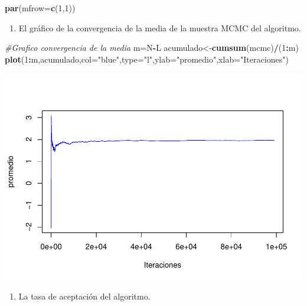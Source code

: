 \documentclass[
]{article}
\newenvironment{Shaded}{\begin{snugshade}}{\end{snugshade}}
\newcommand{\AttributeTok}[1]{\textcolor[rgb]{0.13,0.29,0.53}{#1}}
\newcommand{\CommentTok}[1]{\textcolor[rgb]{0.56,0.35,0.01}{\textit{#1}}}
\newcommand{\DecValTok}[1]{\textcolor[rgb]{0.00,0.00,0.81}{#1}}
\newcommand{\FunctionTok}[1]{\textcolor[rgb]{0.13,0.29,0.53}{\textbf{#1}}}
\newcommand{\NormalTok}[1]{#1}
\newcommand{\OtherTok}[1]{\textcolor[rgb]{0.56,0.35,0.01}{#1}}
\newcommand{\SpecialCharTok}[1]{\textcolor[rgb]{0.81,0.36,0.00}{\textbf{#1}}}
\newcommand{\StringTok}[1]{\textcolor[rgb]{0.31,0.60,0.02}{#1}}
\providecommand{\tightlist}{%
  \setlength{\itemsep}{0pt}\setlength{\parskip}{0pt}}
\begin{document}
\begin{Shaded}
\begin{Highlighting}[]
\FunctionTok{par}\NormalTok{(}\AttributeTok{mfrow=}\FunctionTok{c}\NormalTok{(}\DecValTok{1}\NormalTok{,}\DecValTok{1}\NormalTok{))}
\end{Highlighting}
\end{Shaded}

\begin{enumerate}
\def\labelenumi{\alph{enumi}.}
\setcounter{enumi}{5}
\tightlist
\item
  El gráfico de la convergencia de la media de la muestra MCMC del
  algoritmo.
\end{enumerate}

\begin{Shaded}
\begin{Highlighting}[]
\CommentTok{\#Grafico convergencia de la media}
\NormalTok{m}\OtherTok{=}\NormalTok{N}\SpecialCharTok{{-}}\NormalTok{L}
\NormalTok{acumulado}\OtherTok{\textless{}{-}}\FunctionTok{cumsum}\NormalTok{(mcmc)}\SpecialCharTok{/}\NormalTok{(}\DecValTok{1}\SpecialCharTok{:}\NormalTok{m)}
\FunctionTok{plot}\NormalTok{(}\DecValTok{1}\SpecialCharTok{:}\NormalTok{m,acumulado,}\AttributeTok{col=}\StringTok{"blue"}\NormalTok{,}\AttributeTok{type=}\StringTok{"l"}\NormalTok{,}\AttributeTok{ylab=}\StringTok{"promedio"}\NormalTok{,}\AttributeTok{xlab=}\StringTok{"Iteraciones"}\NormalTok{)}
\end{Highlighting}
\end{Shaded}

\includegraphics{tarea2_files/figure-latex/unnamed-chunk-17-1.pdf}

\begin{enumerate}
\def\labelenumi{\alph{enumi}.}
\setcounter{enumi}{6}
\tightlist
\item
  La tasa de aceptación del algoritmo.
\end{enumerate}
\end{document}
